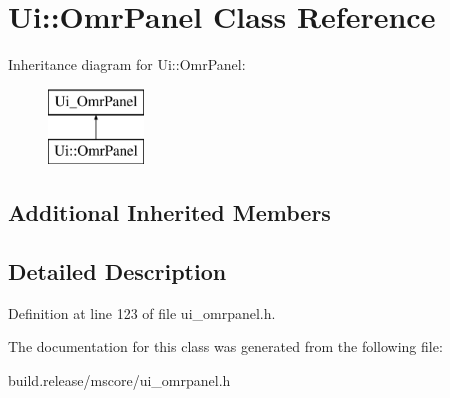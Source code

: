 \hypertarget{class_ui_1_1_omr_panel}{}\section{Ui\+:\+:Omr\+Panel Class Reference}
\label{class_ui_1_1_omr_panel}
Inheritance diagram for Ui\+:\+:Omr\+Panel\+:\begin{figure}[H]
\begin{center}
\leavevmode
\includegraphics[height=2.000000cm]{class_ui_1_1_omr_panel}
\end{center}
\end{figure}
\subsection*{Additional Inherited Members}


\subsection{Detailed Description}


Definition at line 123 of file ui\+\_\+omrpanel.\+h.



The documentation for this class was generated from the following file\+:\begin{DoxyCompactItemize}
\item 
build.\+release/mscore/ui\+\_\+omrpanel.\+h\end{DoxyCompactItemize}
